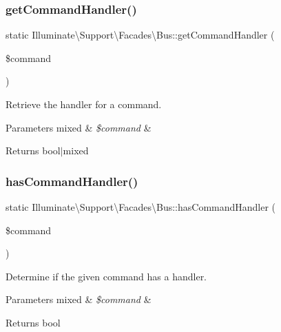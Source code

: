 \subsubsection{\texorpdfstring{get\+Command\+Handler()}{getCommandHandler()}}
{\footnotesize\ttfamily static Illuminate\textbackslash{}\+Support\textbackslash{}\+Facades\textbackslash{}\+Bus\+::get\+Command\+Handler (\begin{DoxyParamCaption}\item[{}]{\$command }\end{DoxyParamCaption})\hspace{0.3cm}{\ttfamily [static]}}

Retrieve the handler for a command.


\begin{DoxyParams}[1]{Parameters}
mixed & {\em \$command} & \\
\hline
\end{DoxyParams}
\begin{DoxyReturn}{Returns}
bool$\vert$mixed 
\end{DoxyReturn}
\mbox{\label{class_illuminate_1_1_support_1_1_facades_1_1_bus_a9ce6c02e0ce39585a360f85c34c4bc42}} 
\subsubsection{\texorpdfstring{has\+Command\+Handler()}{hasCommandHandler()}}
{\footnotesize\ttfamily static Illuminate\textbackslash{}\+Support\textbackslash{}\+Facades\textbackslash{}\+Bus\+::has\+Command\+Handler (\begin{DoxyParamCaption}\item[{}]{\$command }\end{DoxyParamCaption})\hspace{0.3cm}{\ttfamily [static]}}

Determine if the given command has a handler.


\begin{DoxyParams}[1]{Parameters}
mixed & {\em \$command} & \\
\hline
\end{DoxyParams}
\begin{DoxyReturn}{Returns}
bool 
\end{DoxyReturn}
\mbox{\label{class_illuminate_1_1_support_1_1_facades_1_1_bus_a944bb1fc82a5d13749d20d31b1da9a9a}} 
